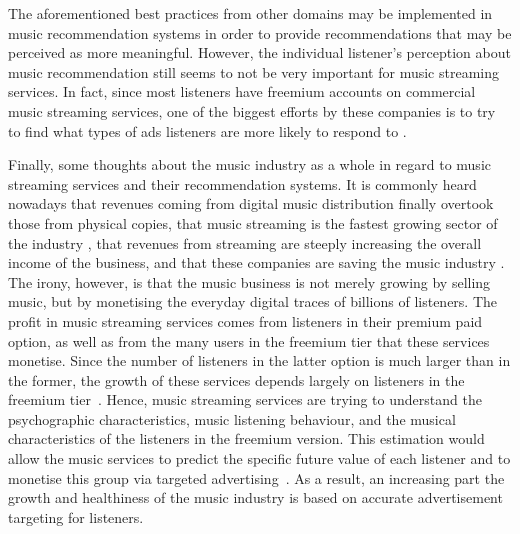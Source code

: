 The aforementioned best practices from other domains may be implemented in music recommendation systems in order to provide  recommendations that may be perceived as more meaningful. However, the individual listener's perception about music recommendation still seems to not be very important for music streaming services.
In fact, since most listeners have freemium accounts on commercial music streaming services, one of the biggest efforts by these companies is to try to find what types of ads listeners are more likely to respond to \autocite{prey16musica}.





Finally, some thoughts about the music industry as a whole in regard to music streaming services and their recommendation systems. 
It is commonly heard nowadays that revenues coming from digital music distribution finally overtook those from physical copies, that music streaming is the fastest growing sector of the industry \autocite{ifpi15global}, that revenues from streaming are steeply increasing the overall income of the business, and that these companies are saving the music industry \autocite{ifpi16global}. 
The irony, however, is that the music business is not merely growing by selling music, but by monetising the everyday digital traces of billions of listeners. 
The profit in music streaming services comes from listeners in their premium paid option, as well as from the many users in the freemium tier that these services monetise. 
Since the number of listeners in the latter option is much larger than in the former, the growth of these services depends largely on listeners in the freemium tier~\autocite{midia13making}.
Hence, music streaming services are trying to understand the psychographic characteristics, music listening behaviour, and the musical characteristics of the listeners in the freemium version. This estimation would allow the music services to predict the specific future value of each listener and to monetise this group via targeted advertising~\autocite{echonest13how}.
As a result, an increasing part the growth and healthiness of the music industry is based on accurate advertisement targeting for listeners.

